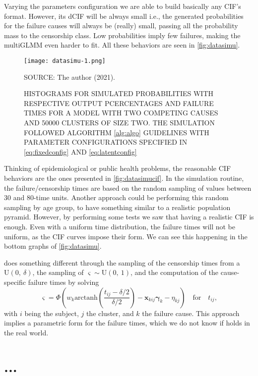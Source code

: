 Varying the parameters configuration we are able to build basically any
CIF's format. However, its dCIF will be always small i.e., the generated
probabilities for the failure causes will always be (really) small,
passing all the probability mass to the censorship class. Low
probabilities imply few failures, making the multiGLMM even harder to
fit. All these behaviors are seen in \autoref{fig:datasimu}.

\begin{figure}[H]
 \setlength{\abovecaptionskip}{.0001pt}
\caption{HISTOGRAMS FOR SIMULATED PROBABILITIES WITH RESPECTIVE OUTPUT
          PCERCENTAGES AND FAILURE TIMES FOR A MODEL WITH TWO COMPETING
          CAUSES AND 50000 CLUSTERS OF SIZE TWO. THE SIMULATION FOLLOWED
          ALGORITHM \autoref{alg:algo} GUIDELINES WITH PARAMETER
          CONFIGURATIONS SPECIFIED IN \autoref{eq:fixedconfig}
          AND \autoref{eq:latentconfig}}
\vspace{0.2cm}\centering
 \texttt{[image: datasimu-1.png]}\\
 \begin{footnotesize}
  SOURCE: The author (2021).
 \end{footnotesize}
 \label{fig:datasimu}
\end{figure}

Thinking of epidemiological or public health problems, the reasonable
CIF behaviors are the ones presented in \autoref{fig:datasimucif}. In
the simulation routine, the failure/censorship times are based on the
random sampling of values between 30 and 80-time units. Another approach
could be performing this random sampling by age group, to have something
similar to a realistic population pyramid. However, by performing some
tests we saw that having a realistic CIF is enough. Even with a uniform
time distribution, the failure times will not be uniform, as the CIF
curves impose their form. We can see this happening in the bottom graphs
of \autoref{fig:datasimu}.

 does something different through the sampling of
the censorship times from a \(\text{U}(0,~\delta)\), the sampling of
\(\varsigma\sim\text{U}(0,~1)\), and the computation of the
cause-specific failure times by solving
\[
 \varsigma =
 \Phi\left(w_{k}
           \text{arctanh}\left(\frac{t_{ij}-\delta/2}{\delta/2}\right) -
           \bm{x}_{kij}\bm{\gamma}_{k} - \eta_{kj}
     \right)
 \quad\text{for}\quad t_{ij},
\]
with \(i\) being the subject, \(j\) the cluster, and \(k\) the failure
cause. This approach implies a parametric form for the failure times,
which we do not know if holds in the real world.

\section{...}
\label{cap:data}

